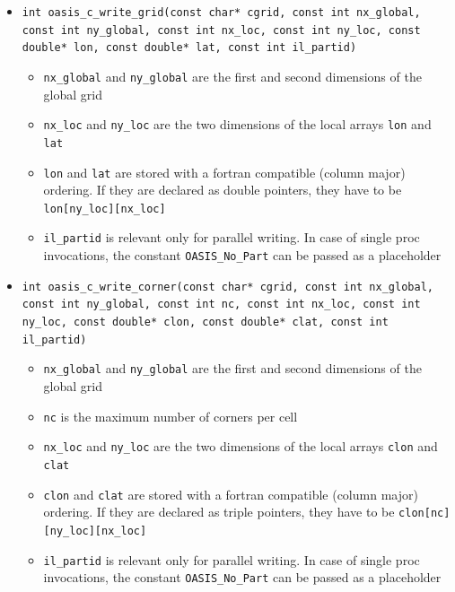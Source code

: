 \begin{itemize}
\vspace{0.2cm}
\item {\tt int oasis\_c\_write\_grid(const char* cgrid, const int nx\_global, const int ny\_global, const int nx\_loc, const int ny\_loc, const double* lon, const double* lat, const int il\_partid)}
  \begin{itemize}
    \item {\tt nx\_global} and {\tt ny\_global} are the first and second dimensions
      of the global grid
    \item {\tt nx\_loc} and {\tt ny\_loc} are the two dimensions
      of the local arrays {\tt lon} and {\tt lat}
    \item {\tt lon} and {\tt lat} are stored with a fortran compatible
      (column major) ordering. If they are declared as double
      pointers, they have to be {\tt lon[ny\_loc][nx\_loc]}
    \item {\tt il\_partid} is relevant only for parallel writing. In case
      of single proc invocations, the constant {\tt OASIS\_No\_Part}
      can be passed as a placeholder
  \end{itemize}

\vspace{0.2cm}
\item {\tt int oasis\_c\_write\_corner(const char* cgrid, const int nx\_global, const int ny\_global, const int nc, const int nx\_loc, const int ny\_loc, const double* clon, const double* clat, const int il\_partid)}
  \begin{itemize}
    \item {\tt nx\_global} and {\tt ny\_global} are the first and second dimensions
      of the global grid
    \item {\tt nc} is the maximum number of corners per cell
    \item {\tt nx\_loc} and {\tt ny\_loc} are the two dimensions
      of the local arrays {\tt clon} and {\tt clat}
    \item {\tt clon} and {\tt clat} are stored with a fortran compatible
      (column major) ordering. If they are declared as triple
      pointers, they have to be {\tt clon[nc][ny\_loc][nx\_loc]}
    \item {\tt il\_partid} is relevant only for parallel writing. In case
      of single proc invocations, the constant {\tt OASIS\_No\_Part}
      can be passed as a placeholder
  \end{itemize}


\end{itemize}
